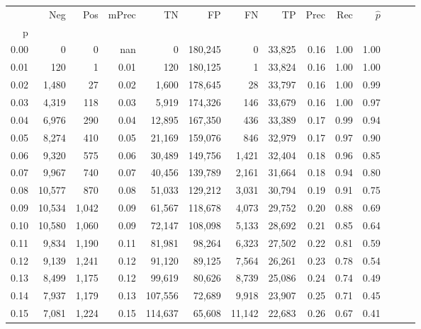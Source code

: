 \begin{tabular}{rrrrrrrrrrrrrr}
\toprule
{} &     Neg &    Pos & mPrec &       TN &       FP &      FN &      TP &  Prec &   Rec & $\hat{p}$ \\
p    &         &        &       &          &          &         &         &       &       &           \\
\midrule
0.00 &       0 &      0 &   nan &        0 &  180,245 &       0 &  33,825 &  0.16 &  1.00 &      1.00 \\
0.01 &     120 &      1 &  0.01 &      120 &  180,125 &       1 &  33,824 &  0.16 &  1.00 &      1.00 \\
0.02 &   1,480 &     27 &  0.02 &    1,600 &  178,645 &      28 &  33,797 &  0.16 &  1.00 &      0.99 \\
0.03 &   4,319 &    118 &  0.03 &    5,919 &  174,326 &     146 &  33,679 &  0.16 &  1.00 &      0.97 \\
0.04 &   6,976 &    290 &  0.04 &   12,895 &  167,350 &     436 &  33,389 &  0.17 &  0.99 &      0.94 \\
0.05 &   8,274 &    410 &  0.05 &   21,169 &  159,076 &     846 &  32,979 &  0.17 &  0.97 &      0.90 \\
0.06 &   9,320 &    575 &  0.06 &   30,489 &  149,756 &   1,421 &  32,404 &  0.18 &  0.96 &      0.85 \\
0.07 &   9,967 &    740 &  0.07 &   40,456 &  139,789 &   2,161 &  31,664 &  0.18 &  0.94 &      0.80 \\
0.08 &  10,577 &    870 &  0.08 &   51,033 &  129,212 &   3,031 &  30,794 &  0.19 &  0.91 &      0.75 \\
0.09 &  10,534 &  1,042 &  0.09 &   61,567 &  118,678 &   4,073 &  29,752 &  0.20 &  0.88 &      0.69 \\
0.10 &  10,580 &  1,060 &  0.09 &   72,147 &  108,098 &   5,133 &  28,692 &  0.21 &  0.85 &      0.64 \\
0.11 &   9,834 &  1,190 &  0.11 &   81,981 &   98,264 &   6,323 &  27,502 &  0.22 &  0.81 &      0.59 \\
0.12 &   9,139 &  1,241 &  0.12 &   91,120 &   89,125 &   7,564 &  26,261 &  0.23 &  0.78 &      0.54 \\
0.13 &   8,499 &  1,175 &  0.12 &   99,619 &   80,626 &   8,739 &  25,086 &  0.24 &  0.74 &      0.49 \\
0.14 &   7,937 &  1,179 &  0.13 &  107,556 &   72,689 &   9,918 &  23,907 &  0.25 &  0.71 &      0.45 \\
0.15 &   7,081 &  1,224 &  0.15 &  114,637 &   65,608 &  11,142 &  22,683 &  0.26 &  0.67 &      0.41 \\

\end{tabular}
